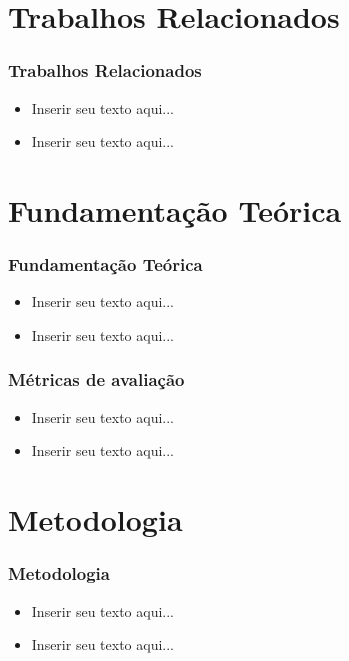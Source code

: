 \documentclass[aspectratio=34, 14pt]{latex-slides}
\begin{document}
\section{Trabalhos Relacionados}
\begin{frame}
    \frametitle{Trabalhos Relacionados}

    \begin{itemize}
        \item Inserir seu texto aqui...
        \item Inserir seu texto aqui...
    \end{itemize}
\end{frame}

\section{Fundamentação Teórica}
\begin{frame}
    \frametitle{Fundamentação Teórica}

    \begin{itemize}
        \item Inserir seu texto aqui...
        \item Inserir seu texto aqui...
    \end{itemize}
\end{frame}

\begin{frame}
    \frametitle{Métricas de avaliação}

    \begin{itemize}
        \item Inserir seu texto aqui...
        \item Inserir seu texto aqui...
    \end{itemize}
\end{frame}

\section{Metodologia}
\begin{frame}
    \frametitle{Metodologia}

    \begin{itemize}
        \item Inserir seu texto aqui...
        \item Inserir seu texto aqui...
    \end{itemize}
\end{frame}
\end{document}
